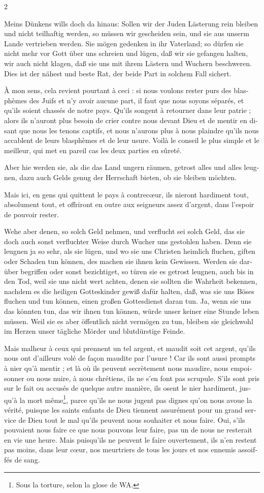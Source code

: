 \documentclass[a4paper,12pt]{article}
\newcommand\chunks[2]{%
\begin{leftcolumn*}\begin{otherlanguage}{german}%
{#1}%
\end{otherlanguage}\end{leftcolumn*}%
\begin{rightcolumn}\begin{otherlanguage}{french}%
{#2}%
\end{otherlanguage}\end{rightcolumn}%
}
\begin{document}
\begin{paracol}{2}
  \chunks{Meins Dünkens wills doch da hinaus: Sollen wir der Juden Lästerung rein bleiben und nicht teilhaftig werden, so müssen wir gescheiden sein, und sie aus unserm Lande vertrieben werden. Sie mögen gedenken in ihr Vaterland; so dürfen sie nicht mehr vor Gott über uns schreien und lügen, daß wir sie gefangen halten, wir auch nicht klagen, daß sie uns mit ihrem Lästern und Wuchern beschweren. Dies ist der nähest und beste Rat, der beide Part in solchem Fall sichert.}
         {À mon sens, cela revient pourtant à ceci : si nous voulons rester purs des blasphèmes des Juifs et n’y avoir aucune part, il faut que nous soyons séparés, et qu’ils soient chassés de notre pays. Qu’ils songent à retourner dans leur patrie ; alors ils n’auront plus besoin de crier contre nous devant Dieu et de mentir en disant que nous les tenons captifs, et nous n’aurons plus à nous plaindre qu’ils nous accablent de leurs blasphèmes et de leur usure. Voilà le conseil le plus simple et le meilleur, qui met en pareil cas les deux parties en sûreté.}
  \chunks{Aber hie werden sie, als die das Land ungern räumen, getrost alles und alles leugnen, dazu auch Gelds genug der Herrschaft bieten, ob sie bleiben möchten.}
         {Mais ici, en gens qui quittent le pays à contrecœur, ils nieront hardiment tout, absolument tout, et offriront en outre aux seigneurs assez d’argent, dans l’espoir de pouvoir rester.}
  \chunks{Wehe aber denen, so solch Geld nehmen, und verflucht sei solch Geld, das sie doch auch sonst verfluchter Weise durch Wucher uns gestohlen haben. Denn sie leugnen ja so sehr, als sie lügen, und wo sie uns Christen heimlich fluchen, giften oder Schaden tun können, des machen sie ihnen kein Gewissen. Werden sie darüber begriffen oder sonst bezichtiget, so türen sie es getrost leugnen, auch bis in den Tod, weil sie uns nicht wert achten, denen sie sollten die Wahrheit bekennen, nachdem es die heiligen Gotteskinder gewiß dafür halten, daß, was sie uns Böses fluchen und tun können, einen großen Gottesdienst daran tun. Ja, wenn sie uns das könnten tun, das wir ihnen tun können, würde unser keiner eine Stunde leben müssen. Weil sie es aber öffentlich nicht vermögen zu tun, bleiben sie gleichwohl im Herzen unser tägliche Mörder und blutdürstige Feinde.}
         {Mais malheur à ceux qui prennent un tel argent, et maudit soit cet argent, qu’ils nous ont d’ailleurs volé de façon maudite par l’usure ! Car ils sont aussi prompts à nier qu’à mentir ; et là où ils peuvent secrètement nous maudire, nous empoisonner ou nous nuire, à nous chrétiens, ils ne s’en font pas scrupule. S’ils sont pris sur le fait ou accusés de quelque autre manière, ils osent le nier hardiment, jusqu’à la mort même\footnote{Sous la torture, selon la glose de WA.}, parce qu’ils ne nous jugent pas dignes qu’on nous avoue la vérité, puisque les saints enfants de Dieu tiennent assurément pour un grand service de Dieu tout le mal qu’ils peuvent nous souhaiter et nous faire. Oui, s’ils pouvaient nous faire ce que nous pouvons leur faire, pas un de nous ne resterait en vie une heure. Mais puisqu’ils ne peuvent le faire ouvertement, ils n’en restent pas moins, dans leur cœur, nos meurtriers de tous les jours et nos ennemis assoiffés de sang.}

\end{paracol}
\end{document}

